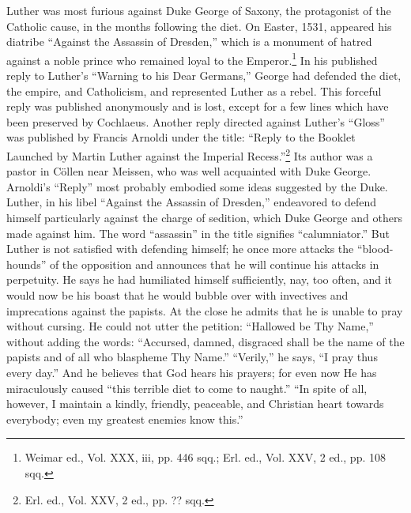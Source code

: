 Luther was most furious against Duke George of Saxony, the
protagonist of the Catholic cause, in the months following the diet.
On Easter, 1531, appeared his diatribe “Against the Assassin of Dresden,”
which is a monument of hatred against a noble prince who
remained loyal to the Emperor.\footnote
{Weimar ed., Vol. XXX, iii, pp. 446 sqq.; Erl. ed., Vol. XXV, 2 ed., pp. 108 sqq.}
 In his published reply to Luther’s
“Warning to his Dear Germans,” George had defended the diet, the
empire, and Catholicism, and represented Luther as a rebel. This forceful
reply was published anonymously and is lost, except for a few
lines which have been preserved by Cochlaeus. Another reply directed
against Luther’s “Gloss” was published by Francis Arnoldi
under the title: “Reply to the Booklet Launched by Martin Luther
against the Imperial Recess.”\footnote{Erl. ed., Vol. XXV, 2 ed., pp. ?? sqq.}
Its author was a pastor in Cöllen
near Meissen, who was well acquainted with Duke George. Arnoldi’s
“Reply” most probably embodied some ideas suggested by the Duke.
Luther, in his libel “Against the Assassin of Dresden,” endeavored
to defend himself particularly against the charge of sedition, which
Duke George and others made against him. The word “assassin” in
the title signifies “calumniator.” But Luther is not satisfied with
defending himself; he once more attacks the “blood-hounds” of the
opposition and announces that he will continue his attacks in perpetuity.
He says he had humiliated himself sufficiently, nay, too often,
and it would now be his boast that he would bubble over with invectives
and imprecations against the papists. At the close he admits
that he is unable to pray without cursing. He could not utter the petition:
“Hallowed be Thy Name,” without adding the words: “Accursed, damned, disgraced
shall be the name of the papists and of all
who blaspheme Thy Name.” “Verily,” he says, “I pray thus every
day.” And he believes that God hears his prayers; for even now He has
miraculously caused “this terrible diet to come to naught.” “In spite
of all, however, I maintain a kindly, friendly, peaceable, and Christian
heart towards everybody; even my greatest enemies know this.”

